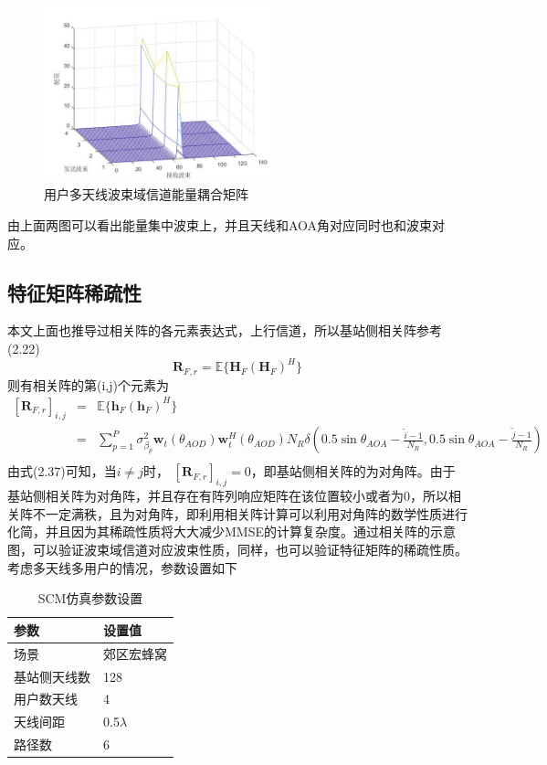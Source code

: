 \documentclass[bachelor,nocolorlinks, printoneside]{seuthesis} %
\begin{document}
\begin{Main}
\begin{figure}[htbp!]
	\centering \includegraphics[width=0.6\textwidth]{img/2_3.jpg} \caption{用户多天线波束域信道能量耦合矩阵}
\end{figure}

由上面两图可以看出能量集中波束上，并且天线和AOA角对应同时也和波束对应。

\subsection{特征矩阵稀疏性}
本文上面也推导过相关阵的各元素表达式，上行信道，所以基站侧相关阵参考(2.22)
\begin{equation}\label{key}
\mathbf{R}_{F,r} = \mathbb{E} \lbrace \mathbf{H}_{F} (\mathbf{H}_{F})^{H} \rbrace
\end{equation}
则有相关阵的第(i,j)个元素为
\begin{eqnarray}\label{key}
[ \mathbf{R}_{F,r} ]_{i,j} & = &\mathbb{E} \lbrace \mathbf{h}_{F} (\mathbf{h}_{F})^{H} \rbrace  \nonumber \\
& = & \sum_{p=1}^{P} \sigma_{\beta_p}^{2} \mathbf{w}_{t}(\theta_{AOD}) \mathbf{w}_{t}^{H}(\theta_{AOD}) N_R \delta \left( 0.5\sin \theta_{AOA} - \frac{\tilde{i}-1}{N_R} , 0.5\sin \theta_{AOA} - \frac{\tilde{j}-1}{N_R} \right) \nonumber \\
\end{eqnarray}
由式(2.37)可知，当$ i \neq j$时， $ [ \mathbf{R}_{F,r} ]_{i,j} = 0$，即基站侧相关阵的为对角阵。由于基站侧相关阵为对角阵，并且存在有阵列响应矩阵在该位置较小或者为0，所以相关阵不一定满秩，且为对角阵，即利用相关阵计算可以利用对角阵的数学性质进行化简，并且因为其稀疏性质将大大减少MMSE的计算复杂度。通过相关阵的示意图，可以验证波束域信道对应波束性质，同样，也可以验证特征矩阵的稀疏性质。
考虑多天线多用户的情况，参数设置如下
\begin{table}[htbp]
	\centering
	\caption{\label{tab:test}SCM仿真参数设置}
	\begin{tabular}{ll}
		\toprule
		参数 &  设置值 \\
		\bottomrule
		场景 &  郊区宏蜂窝 \\
		\bottomrule
		基站侧天线数 & 128 \\
		\bottomrule
		用户数天线	& 4 \\
		\bottomrule
		天线间距 & 0.5$\lambda$ \\
		\bottomrule
		路径数 & 6 \\
		\bottomrule
	\end{tabular}
\end{table}


\end{Main}
\end{document}
